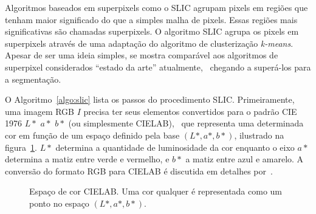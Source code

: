 Algoritmos baseados em superpixels como o SLIC agrupam pixels em
regiões que tenham maior significado do que a simples malha de
pixels. Essas regiões mais significativas são chamadas superpixels. O
algoritmo SLIC agrupa os pixels em superpixels através de uma
adaptação do algoritmo de clusterização \emph{k-means}. Apesar de ser
uma ideia simples, se mostra comparável aos algoritmos de superpixel
considerados ``estado da arte'' atualmente,~\cite{slic} chegando a
superá-los para a segmentação.

O Algoritmo~\ref{algo:slic} lista os passos do procedimento
SLIC. Primeiramente, uma imagem RGB $I$ precisa ter seus elementos
convertidos para o padrão CIE 1976 $L*$ $a*$ $b*$ (ou simplesmente
CIELAB),~\cite{cielab1} que representa uma determinada cor em função
de um espaço definido pela base $(L*, a*, b*)$, ilustrado na
figura~\ref{fig:cielab}. $L*$ determina a quantidade de luminosidade
da cor enquanto o eixo $a*$ determina a matiz entre verde e vermelho,
e $b*$ a matiz entre azul e amarelo. A conversão do formato RGB para
CIELAB é discutida em detalhes por~\citeauthor{cielab2}.

\begin{figure}[ht!]
\begin{center}
    \caption{Espaço de cor CIELAB. Uma cor qualquer é representada como um ponto
    no espaço $(L*, a*, b*)$.}
  \label{fig:cielab}

  \fonteminha
  \end{center}
\end{figure}


